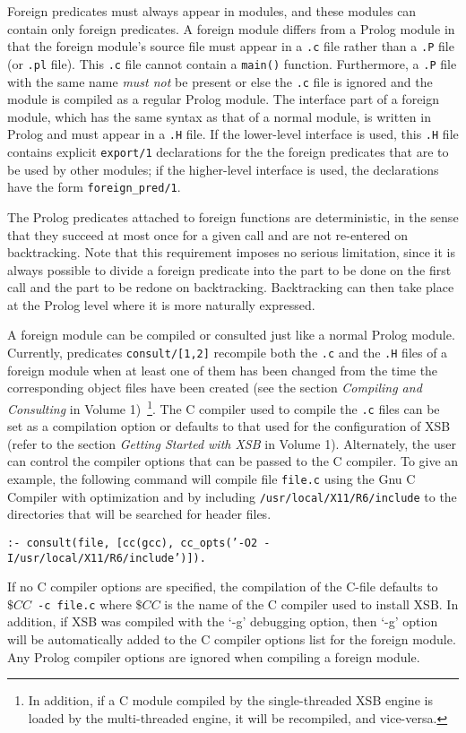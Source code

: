 Foreign predicates must always appear in modules, and these modules
can contain only foreign predicates.  A foreign module differs from a
Prolog module in that the foreign module's source file must appear in
a {\tt *.c} file rather than a {\tt *.P} file (or {\tt .pl} file).
This {\tt *.c} file cannot contain a {\tt main()} function.
Furthermore, a {\tt *.P} file with the same name {\em must not} be
present or else the {\tt *.c} file is ignored and the module is
compiled as a regular Prolog module.  The interface part of a foreign
module, which has the same syntax as that of a normal module, is
written in Prolog and must appear in a {\tt *.H} file.  If the
lower-level interface is used, this {\tt *.H} file contains explicit
{\tt export/1} declarations for the the foreign predicates that are to
be used by other modules; if the higher-level interface is used, the
declarations have the form {\tt foreign\_pred/1}.

The Prolog predicates attached to foreign functions are deterministic,
in the sense that they succeed at most once for a given call and are
not re-entered on backtracking.  Note that this requirement imposes no
serious limitation, since it is always possible to divide a foreign
predicate into the part to be done on the first call and the part to
be redone on backtracking.  Backtracking can then take place at the
Prolog level where it is more naturally expressed.

A foreign module can be compiled or consulted just like a normal
Prolog module.  Currently, predicates {\tt consult/[1,2]} recompile
both the {\tt *.c} and the {\tt *.H} files of a foreign module when at
least one of them has been changed from the time the corresponding
object files have been created (see the section {\it Compiling and
  Consulting} in Volume 1)~\footnote{In addition, if a C module
  compiled by the single-threaded XSB engine is loaded by the
  multi-threaded engine, it will be recompiled, and vice-versa.}.  The
C compiler used to compile the {\tt *.c} files can be set as a
compilation option or defaults to that used for the configuration of
XSB (refer to the section {\it Getting Started with XSB} in Volume 1).
Alternately, the user can control the compiler options that can be
passed to the C compiler.  To give an example, the following command
will compile file {\tt file.c} using the Gnu C Compiler with
optimization and by including {\tt /usr/local/X11/R6/include} to the
directories that will be searched for header files.
\begin{center}
{\tt  :- consult(file,
                 [cc(gcc), cc\_opts('-O2 -I/usr/local/X11/R6/include')]). }
\end{center}
If no C compiler options are specified, the compilation of the C-file
defaults to $\$CC$~{\tt -c~file.c} where $\$CC$ is the name of the C
compiler used to install XSB.  In addition, if XSB was compiled with
the `-g' debugging option, then `-g' option will be automatically
added to the C compiler options list for the foreign module.  Any
Prolog compiler options are ignored when compiling a foreign module.

